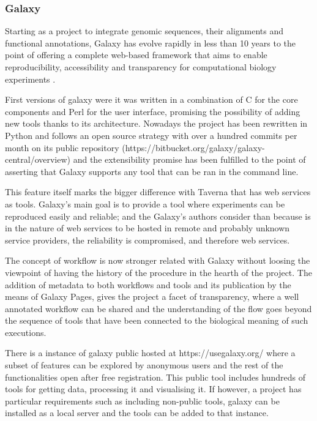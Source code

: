 \subsubsection{Galaxy}
Starting as a project to integrate genomic sequences, their alignments and functional annotations, Galaxy has evolve rapidly in less than 10 years to the point of offering a complete web-based framework that aims to enable reproducibility, accessibility and transparency for computational biology experiments \cite{GIA2005, GOE2010}.

First versions of galaxy were  it was written in a combination of C for the core components and Perl for the user interface, promising the possibility of adding new tools thanks to its architecture. Nowadays the project has been rewritten in Python and follows an open source strategy with over a hundred commits per month on its public repository (https://bitbucket.org/galaxy/galaxy-central/overview) and the extensibility promise has been fulfilled to the point of asserting that Galaxy supports any tool that can be ran in the command line.

This feature itself marks the bigger difference with Taverna that has web services as tools. Galaxy's main goal is to provide a tool where experiments can be reproduced easily and reliable; and the Galaxy's authors consider than because is in the nature of web services to be hosted in remote and probably unknown service providers, the reliability is compromised, and therefore web services.

The concept of workflow is now stronger related with Galaxy without loosing the viewpoint of having the history of the procedure in the hearth of the project. The addition of metadata to both workflows and tools and its publication by the means of Galaxy Pages, gives the project a facet of transparency, where a well annotated workflow can be shared and the understanding of the flow goes beyond the sequence of tools that have been connected to the biological meaning of such executions.

There is a instance of galaxy public hosted at https://usegalaxy.org/ where a subset of features can be explored by anonymous users and the rest of the functionalities open after free registration. This public tool includes hundreds of tools for getting data, processing it and visualising it. If however, a project has particular requirements such as including non-public tools, galaxy can be installed as a local server and the tools can be added to that instance.


